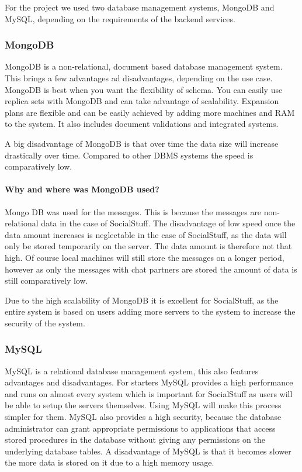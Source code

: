For the project we used two database management systems, MongoDB and MySQL, depending on the requirements of the backend
services.

\subsubsection{MongoDB}
MongoDB is a non-relational, document based database management system.
This brings a few advantages ad disadvantages, depending on the use case.
MongoDB is best when you want the flexibility of schema.
You can easily use replica sets with MongoDB and can take advantage of scalability.
Expansion plans are flexible and can be easily achieved by adding more machines and RAM to the system.
It also includes document validations and integrated systems.

A big disadvantage of MongoDB is that over time the data size will increase drastically over time.
Compared to other DBMS systems the speed is comparatively low.

\paragraph{Why and where was MongoDB used?}
Mongo DB was used for the messages.
This is because the messages are non-relational data in the case of SocialStuff.
The disadvantage of low speed once the data amount increases is neglectable in the case of SocialStuff, as the data will
only be stored temporarily on the server.
The data amount is therefore not that high.
Of course local machines will still store the messages on a longer period, however as only the messages with chat
partners are stored the amount of data is still comparatively low.

Due to the high scalability of MongoDB it is excellent for SocialStuff, as the entire system is based on users adding
more servers to the system to increase the security of the system.

\subsubsection{MySQL}
MySQL is a relational database management system, this also features advantages and disadvantages.
For starters MySQL provides a high performance and runs on almost every system which is important for SocialStuff as
users will be able to setup the servers themselves.
Using MySQL will make this process simpler for them.
MySQL also provides a high security, because the database administrator can grant appropriate permissions to
applications that access stored procedures in the database without giving any permissions on the underlying database
tables.
A disadvantage of MySQL is that it becomes slower the more data is stored on it due to a high memory usage.

